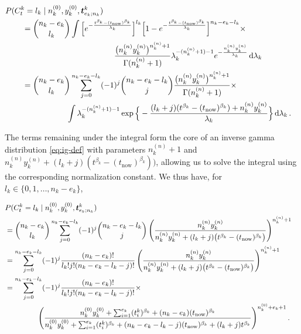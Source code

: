 \documentclass[Journal,SectionNumbers,SingleSpace,InsideFigs]{ascelike}
\newcommand{\dd}{\,\mathrm{d}}
\renewcommand{\vec}[1]{{\bm#1}}
\newcommand{\uz}{^{(0)}} %
\newcommand{\un}{^{(n)}} %
\def\ykz{y\uz_k}
\def\ykn{y\un_k}
\def\nkz{n\uz_k}
\def\nkn{n\un_k}
\def\tnow{t_\text{now}}
\begin{document}
\begin{linenomath*}
\begin{align}
\lefteqn{P(C^k_t = l_k\mid\nkz,\ykz, \vec{t}^k_{e_k;n_k})}\hspace*{5ex} \nonumber\\
 &= { n_k - e_k \choose l_k} \int \Big[    e^{-\frac{t^{\beta_k} - (\tnow)^{\beta_k}}{\lambda_k}}\Big]^{l_k}
                                  \Big[1 - e^{-\frac{t^{\beta_k} - (\tnow)^{\beta_k}}{\lambda_k}}\Big]^{n_k - e_k - l_k}
    \times \nonumber\\ & \hspace*{27ex}
    \frac{\big(\nkn\ykn\big)^{\nkn + 1}}{\Gamma(\nkn+1)} \lambda_k^{-(\nkn + 1) - 1} e^{-\frac{\nkn\ykn}{\lambda_k}} \dd \lambda_k \nonumber\\
 &= { n_k - e_k \choose l_k} \sum_{j=0}^{n_k-e_k-l_k} (-1)^j { n_k - e_k - l_k \choose j} \frac{\big(\nkn\ykn\big)^{\nkn + 1}}{\Gamma(\nkn+1)} 
    \times \nonumber\\ & \hspace*{13ex}
    \int \lambda_k^{-(\nkn + 1) - 1} \exp\Big\{-\frac{(l_k + j) (t^{\beta_k} - (\tnow)^{\beta_k}) + \nkn\ykn}{\lambda_k}\Big\} \dd \lambda_k\,.
\end{align}
\end{linenomath*}
%
The terms remaining under the integral form the core of an inverse gamma distribution \eqref{eq:ig-def}
with parameters $\nkn + 1$ and $\nkn\ykn + (l_k + j) (t^{\beta_k} - (\tnow)^{\beta_k}))$,
allowing us to solve the integral using the corresponding normalization constant.
We thus have, for $l_k \in \{0,1,\ldots,n_k-e_k\}$,
\begin{linenomath*}
\begin{align}
\lefteqn{P(C^k_t = l_k\mid\nkz,\ykz, \vec{t}^k_{e_k;n_k})} \nonumber\\
 &= { n_k - e_k \choose l_k} \sum_{j=0}^{n_k-e_k-l_k} (-1)^j { n_k - e_k - l_k \choose j}
    \left(\frac{\nkn\ykn}{\nkn\ykn + (l_k + j) \big(t^{\beta_k} - (\tnow)^{\beta_k}\big)}\right)^{\nkn + 1} \nonumber\\
 &= \sum_{j=0}^{n_k-e_k-l_k} (-1)^j \frac{(n_k - e_k)!}{l_k! j! (n_k - e_k - l_k - j)!}   
    \left(\frac{\nkn\ykn}{\nkn\ykn + (l_k + j) \big(t^{\beta_k} - (\tnow)^{\beta_k}\big)}\right)^{\nkn + 1} \nonumber\\
 &= \sum_{j=0}^{n_k-e_k-l_k} (-1)^j \frac{(n_k - e_k)!}{l_k! j! (n_k - e_k - l_k - j)!} \times \nonumber\\ & \hspace*{10ex}  
    \left(\frac{\nkz\ykz + \sum_{i=1}^{e_k} (t_i^k)^{\beta_k} + (n_k-e_k)       (\tnow)^{\beta_k} }%
               {\nkz\ykz + \sum_{i=1}^{e_k} (t_i^k)^{\beta_k} + (n_k-e_k-l_k-j) (\tnow)^{\beta_k} + (l_k + j) t^{\beta_k} }\right)^{%
    \nkz + e_k + 1}.
\label{eq:postpred-priorparams}
\end{align}
\end{linenomath*}
\end{document}
